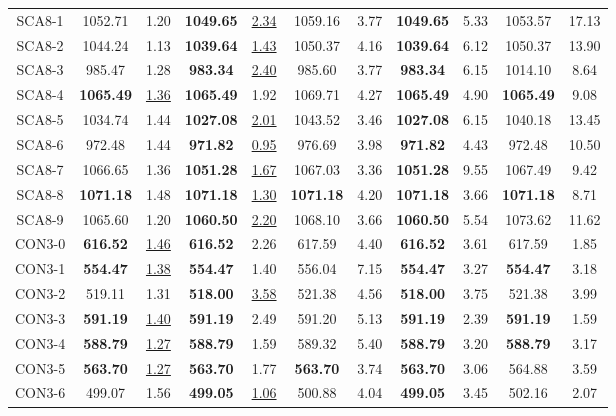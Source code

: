 \begin{table}[h]
\begin{tabular*}{1.00\textwidth}{@{\extracolsep{\fill}} |c||c c|c c|c c|c c|c c|}
SCA8-1 & 1052.71 & 1.20 & \textbf{1049.65} & \underline{2.34} & 1059.16 & 3.77 & \textbf{1049.65} & 5.33 & 1053.57 & 17.13\\
SCA8-2 & 1044.24 & 1.13 & \textbf{1039.64} & \underline{1.43} & 1050.37 & 4.16 & \textbf{1039.64} & 6.12 & 1050.37 & 13.90\\
SCA8-3 & 985.47 & 1.28 & \textbf{983.34} & \underline{2.40} & 985.60 & 3.77 & \textbf{983.34} & 6.15 & 1014.10 & 8.64\\
SCA8-4 & \textbf{1065.49} & \underline{1.36} & \textbf{1065.49} & 1.92 & 1069.71 & 4.27 & \textbf{1065.49} & 4.90 & \textbf{1065.49} & 9.08\\
SCA8-5 & 1034.74 & 1.44 & \textbf{1027.08} & \underline{2.01} & 1043.52 & 3.46 & \textbf{1027.08} & 6.15 & 1040.18 & 13.45\\
SCA8-6 & 972.48 & 1.44 & \textbf{971.82} & \underline{0.95} & 976.69 & 3.98 & \textbf{971.82} & 4.43 & 972.48 & 10.50\\
SCA8-7 & 1066.65 & 1.36 & \textbf{1051.28} & \underline{1.67} & 1067.03 & 3.36 & \textbf{1051.28} & 9.55 & 1067.49 & 9.42\\
SCA8-8 & \textbf{1071.18} & 1.48 & \textbf{1071.18} & \underline{1.30} & \textbf{1071.18} & 4.20 & \textbf{1071.18} & 3.66 & \textbf{1071.18} & 8.71\\
SCA8-9 & 1065.60 & 1.20 & \textbf{1060.50} & \underline{2.20} & 1068.10 & 3.66 & \textbf{1060.50} & 5.54 & 1073.62 & 11.62\\
CON3-0 & \textbf{616.52} & \underline{1.46} & \textbf{616.52} & 2.26 & 617.59 & 4.40 & \textbf{616.52} & 3.61 & 617.59 & 1.85\\
CON3-1 & \textbf{554.47} & \underline{1.38} & \textbf{554.47} & 1.40 & 556.04 & 7.15 & \textbf{554.47} & 3.27 & \textbf{554.47} & 3.18\\
CON3-2 & 519.11 & 1.31 & \textbf{518.00} & \underline{3.58} & 521.38 & 4.56 & \textbf{518.00} & 3.75 & 521.38 & 3.99\\
CON3-3 & \textbf{591.19} & \underline{1.40} & \textbf{591.19} & 2.49 & 591.20 & 5.13 & \textbf{591.19} & 2.39 & \textbf{591.19} & 1.59\\
CON3-4 & \textbf{588.79} & \underline{1.27} & \textbf{588.79} & 1.59 & 589.32 & 5.40 & \textbf{588.79} & 3.20 & \textbf{588.79} & 3.17\\
CON3-5 & \textbf{563.70} & \underline{1.27} & \textbf{563.70} & 1.77 & \textbf{563.70} & 3.74 & \textbf{563.70} & 3.06 & 564.88 & 3.59\\
CON3-6 & 499.07 & 1.56 & \textbf{499.05} & \underline{1.06} & 500.88 & 4.04 & \textbf{499.05} & 3.45 & 502.16 & 2.07\\

\end{tabular*}
\end{table}
